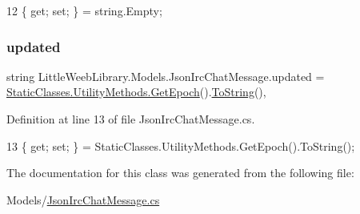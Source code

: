 \begin{DoxyCode}
12 \{ \textcolor{keyword}{get}; \textcolor{keyword}{set}; \} = \textcolor{keywordtype}{string}.Empty;
\end{DoxyCode}
\mbox{\label{class_little_weeb_library_1_1_models_1_1_json_irc_chat_message_aada65302045984832d2073e16bb0b05e}} 
\subsubsection{\texorpdfstring{updated}{updated}}
{\footnotesize\ttfamily string Little\+Weeb\+Library.\+Models.\+Json\+Irc\+Chat\+Message.\+updated = \mbox{\hyperlink{class_little_weeb_library_1_1_static_classes_1_1_utility_methods_a12336d9e64983ddabaad8950486fafb2}{Static\+Classes.\+Utility\+Methods.\+Get\+Epoch}}().\mbox{\hyperlink{class_little_weeb_library_1_1_models_1_1_json_irc_chat_message_ae54b09f8720f6ade5ed128496a4da690}{To\+String}}()\hspace{0.3cm}{\ttfamily [get]}, {\ttfamily [set]}}



Definition at line 13 of file Json\+Irc\+Chat\+Message.\+cs.


\begin{DoxyCode}
13 \{ \textcolor{keyword}{get}; \textcolor{keyword}{set}; \} = StaticClasses.UtilityMethods.GetEpoch().ToString();
\end{DoxyCode}


The documentation for this class was generated from the following file\+:\begin{DoxyCompactItemize}
\item 
Models/\mbox{\hyperlink{_json_irc_chat_message_8cs}{Json\+Irc\+Chat\+Message.\+cs}}\end{DoxyCompactItemize}
